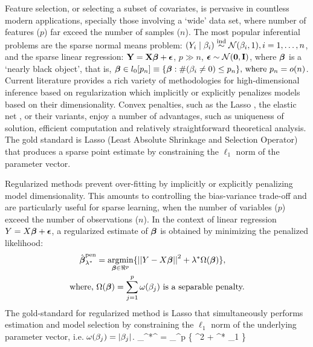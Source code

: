 \documentclass[10pt]{article}
\begin{document}
Feature selection, or selecting a subset of covariates, is pervasive in countless modern applications, specially those involving a `wide' data set, where number of features ($p$) far exceed the number of samples ($n$). The most popular inferential problems are the sparse normal means problem: $(Y_i \mid \beta_i)  \stackrel{\mathrm{ind}}{\sim} \mathcal{N} (\beta_i,1), i = 1, \dots, n$, and the sparse linear regression: ${\bf Y} = {\bf X} \boldsymbol{\beta} + \boldsymbol{\epsilon}$, $p \gg n$, $\boldsymbol{\epsilon} \sim \mathcal{N}({\bf 0}, {\bf I})$, where $\boldsymbol{\beta}$ is a `nearly black object', that is, $\boldsymbol{\beta} \in l_0 [ p_n] \equiv \{ \boldsymbol{\beta} : \# ( \beta_i \neq 0 ) \leq p_n \}, \, \text{where } p_n = o(n) $. Current literature provides a rich variety of methodologies for high-dimensional inference based on regularization which implicitly or explicitly penalizes models based on their dimensionality. Convex penalties, such as the Lasso \citep{tibshirani96}, the elastic net \citep{zou2005regularization}, or their variants, enjoy a number of advantages, such as uniqueness of solution, efficient computation and relatively straightforward theoretical analysis. The gold standard is Lasso (Least Absolute Shrinkage and Selection Operator) that produces a sparse point estimate by constraining the $\ell_1$ norm of the parameter vector.  

Regularized methods prevent over-fitting by implicitly or explicitly penalizing model dimensionality. This amounts to controlling the bias-variance trade-off and are particularly useful for sparse learning, when the number of variables ($p$) exceed the number of observations ($n$). In the context of linear regression $Y = X \boldsymbol{\beta} + \boldsymbol{\epsilon}$, a regularized estimate of $\boldsymbol{\beta}$ is obtained by minimizing the penalized likelihood:
\begin{align}
\hat{\bbeta}_{\lambda^*}^{\text{pen}} & = \argmin_{\bbeta \in \Re^p} \{ \vectornorm{Y - X\bbeta}^2 + \lambda^* \Omega(\bbeta) \}, \label{eq:penalize} \\
  \text{where, } & \Omega(\bbeta) = \sum_{j=1}^{p} \omega(\beta_j) \text{ is a separable penalty.} \nonumber
\end{align}
The gold-standard for regularized method is Lasso that simultaneously performs estimation and model selection by constraining the $\ell_1$ norm of the underlying parameter vector, i.e. $\omega(\beta_j) = \lvert\beta_j\rvert$. 
\beq
\hat{\bbeta}_{\lambda^*}^{} = \argmin_{\bbeta \in \Re^p} \{ ^2 + \lambda^* \norm{\bbeta}_1 \} \label{eq:lasso}
\eeq

\end{document}
